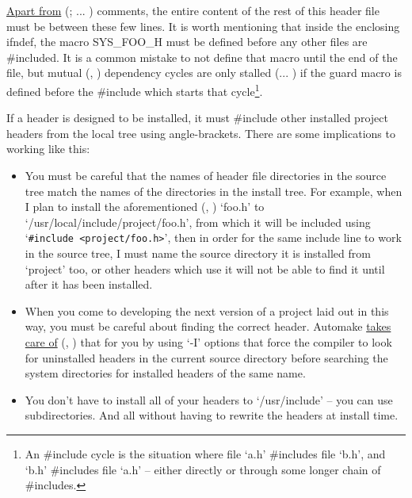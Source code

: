 \underline{Apart from} ({\McQ{}}; {\McQ{}}... {\MaQ{}}) comments,
the entire content of the rest of this header file 
must be between these few lines. It is worth mentioning that inside the 
enclosing ifndef, the macro SYS\_{}FOO\_{}H must be defined before any other 
files are \#included. It is a common mistake to not define that macro until 
the end of the file, but mutual ({\MbQ{}}, {\MfQ{}}) dependency cycles are 
only stalled ({\MfQ{}}... {\McQ{}}) if the 
guard macro is defined before the \#include which starts that
cycle\footnote{An \#include cycle is the situation where file `a.h' \#includes
file `b.h', and `b.h' \#includes file `a.h' -- either directly or through 
some longer chain of \#includes. }. 


If a header is designed to be installed, it must \#include other installed 
project headers from the local tree using angle-brackets. There are some 
implications to working like this: 

\begin{itemize}
\item You must be careful that the names of header file directories in the 
source tree match the names of the directories in the install tree.
For example, when I plan to install the aforementioned ({\MaQ{}}, {\MaQ{}})
`foo.h' to `/usr/local/include/project/foo.h', from which it will be included 
using `\verb+#include <project/foo.h>+', then in order for the same 
include line to work in the source tree, I must name the source directory 
it is installed from `project' too, or other headers which use it will not 
be able to find it until after it has been installed. 

\item When you come to developing the next version of a project laid out 
in this way, you must be careful about finding the correct header. Automake 
\underline{takes care of} ({\MbQ{}}, {\McQ{}}) that for you by using `-I' options 
that force the compiler 
to look for uninstalled headers in the current source directory before 
searching the system directories for installed headers of the same name. 

\item You don't have to install all of your headers to `/usr/include' -- you 
can use subdirectories. And all without having to rewrite the headers at 
install time. 
\end{itemize}

